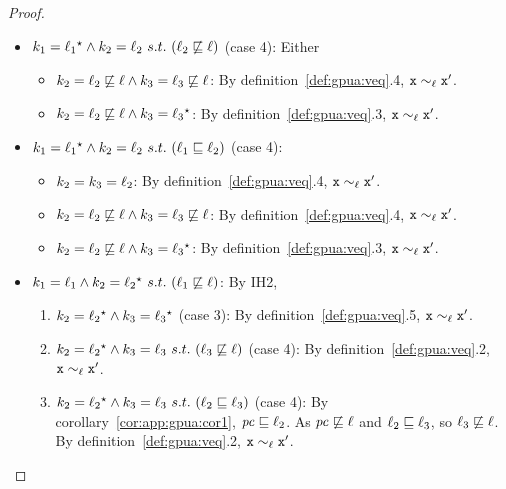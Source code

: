 \begin{proof}
\begin{enumerate}
\begin{itemize}
   \item $k_1 =   \ell_1  {}^\star   \wedge k_2 =
      \ell_2~s.t.~(\ell_2 \not\sqsubseteq \ell)$ (case 4): Either
      \begin{itemize}
        \item $k_2 = \ell_2 \not\sqsubseteq \ell \wedge k_3 =
      \ell_3 \not\sqsubseteq \ell$: By definition~\ref{def:gpua:veq}.4, $\texttt{x} \sim_\ell
      \texttt{x}'$.
    \item $k_2 = \ell_2 \not\sqsubseteq \ell \wedge k_3 =
       \ell_3  {}^\star $: By definition~\ref{def:gpua:veq}.3, $\texttt{x} \sim_\ell
      \texttt{x}'$.
        \end{itemize}
    \item $k_1 =   \ell_1  {}^\star   \wedge k_2 =
      \ell_2~s.t.~ (\ell_1 \sqsubseteq \ell_2)$ (case 4): 
      \begin{itemize}
        \item $k_2 = k_3 = \ell_2$: By definition~\ref{def:gpua:veq}.4, $\texttt{x} \sim_\ell
      \texttt{x}'$.
    \item $k_2 = \ell_2 \not\sqsubseteq \ell \wedge k_3 =
      \ell_3 \not\sqsubseteq \ell$: By definition~\ref{def:gpua:veq}.4, $\texttt{x} \sim_\ell
      \texttt{x}'$.
    \item $k_2 = \ell_2 \not\sqsubseteq \ell \wedge k_3 =
        \ell_3  {}^\star $: By definition~\ref{def:gpua:veq}.3, $\texttt{x} \sim_\ell
      \texttt{x}'$.
        \end{itemize}

   \item $k_1 = \ell_1  \wedge k_2 =  
      \ell_2 {}^\star  ~s.t.~ (\ell_1 \not\sqsubseteq \ell)$: By
      IH2, 
      \begin{enumerate}
        \item $k_2 =   \ell_2  {}^\star   \wedge k_3 =
        \ell_3  {}^\star  $ (case 3): By definition~\ref{def:gpua:veq}.5, $\texttt{x}
         \sim_\ell \texttt{x}'$.
        \item  $k_2 =   \ell_2  {}^\star   \wedge k_3 =
      \ell_3~s.t.~(\ell_3 \not\sqsubseteq \ell)$ (case 4): By
      definition~\ref{def:gpua:veq}.2, $\texttt{x} \sim_\ell \texttt{x}'$.
      \item  $k_2 =   \ell_2  {}^\star   \wedge k_3 =
      \ell_3~s.t.~(\ell_2 \sqsubseteq \ell_3)$ (case 4): By corollary~\ref{cor:app:gpua:cor1},
      $\mathit{pc} \sqsubseteq \ell_2$. As $\mathit{pc} \not\sqsubseteq 
      \ell$ and $\ell_2 \sqsubseteq \ell_3$, so $\ell_3
      \not\sqsubseteq \ell$. By definition~\ref{def:gpua:veq}.2, $\texttt{x} \sim_\ell
      \texttt{x}'$.
     \end{enumerate}


\end{itemize}
\end{enumerate}
\end{proof}
